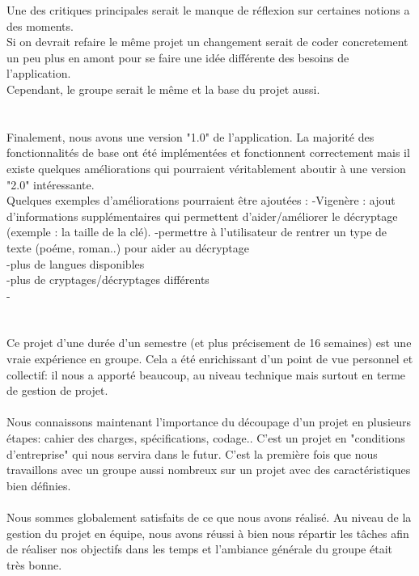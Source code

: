 \documentclass[a4]{article}
\begin{document}
	Une des critiques principales serait le manque de réflexion sur certaines notions a des moments. \\
	
	
		
Si on devrait refaire le même projet un changement serait de coder concretement un peu plus en amont pour se faire une idée différente des besoins de l'application.\\
Cependant, le groupe serait le même et la base du projet aussi. \\ \\ \\
	
	
	Finalement, nous avons une version "1.0" de l’application. La majorité des fonctionnalités
de base ont été implémentées et fonctionnent correctement mais il existe quelques
améliorations qui pourraient véritablement aboutir à une version "2.0" intéressante. \\
Quelques exemples d'améliorations pourraient être ajoutées :
-Vigenère : ajout d'informations supplémentaires qui permettent d'aider/améliorer le décryptage (exemple : la taille de la clé).
-permettre à l'utilisateur de rentrer un type de texte (poéme, roman..) pour aider au décryptage \\
-plus de langues disponibles \\
-plus de cryptages/décryptages différents \\

-\\ \\ \\

	
	
Ce projet d'une durée d'un semestre (et plus précisement de 16 semaines) est une vraie expérience en groupe.
Cela a été enrichissant d'un point de vue personnel et collectif:
il nous a apporté beaucoup, au
niveau technique mais surtout en terme de gestion de projet.  \\  \\
Nous connaissons maintenant l'importance du découpage d'un projet en plusieurs étapes: cahier des charges, spécifications, codage..
C'est un projet en "conditions d'entreprise" qui nous servira dans le futur.
C’est la première fois que nous travaillons avec un groupe aussi nombreux sur un projet avec des caractéristiques bien définies. \\ \\
Nous sommes globalement satisfaits de ce que nous avons réalisé.
Au niveau de la gestion du projet en équipe, nous avons réussi à bien nous répartir les
tâches afin de réaliser nos objectifs dans les temps et l'ambiance générale du groupe était très bonne. \\ \\ \\


	
\end{document}
